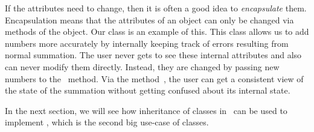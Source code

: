 If the attributes need to change, then it is often a good idea to \emph{encapsulate} them.
Encapsulation means that the attributes of an object can only be changed via methods of the object.
Our  class is an example of this.
This class allows us to add numbers more accurately by internally keeping track of errors resulting from normal summation.
The user never gets to see these internal attributes and also can never modify them directly.
Instead, they are changed by passing new numbers to the ~method.
Via the method~, the user can get a consistent view of the state of the summation without getting confused about its internal state.

In the next section, we will see how inheritance of classes in \python\ can be used to implement , which is the second big use-case of classes.%
\endhsection%
%
\FloatBarrier%
\endhsection%
